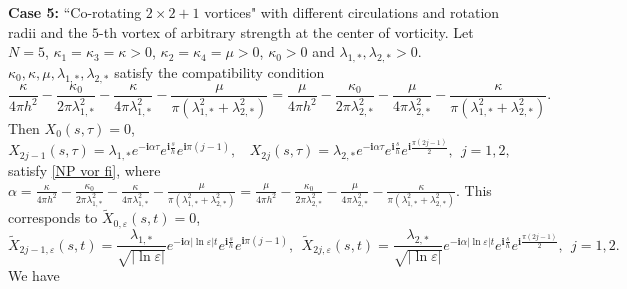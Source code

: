 \documentclass[12pt,reqno]{amsart}
\numberwithin{equation}{section}
\theoremstyle{definition}
\theoremstyle{remark}
\begin{document}
\textbf{Case 5:}  ``Co-rotating  $ 2\times2+1 $ vortices" with different circulations and rotation radii and the $ 5 $-th vortex of arbitrary strength
at the center of vorticity. Let $ N= 5 $, $ \kappa_1=\kappa_3=\kappa>0 $, $ \kappa_2=\kappa_4=\mu>0$, $ \kappa_0>0 $ and $ \lambda_{1,*},\lambda_{2,*}>0 $. $ \kappa_0,\kappa,\mu, \lambda_{1,*},\lambda_{2,*}  $  satisfy  the compatibility condition
\begin{equation}\label{compa cond3} 
\frac{\kappa}{4\pi h^2}-\frac{\kappa_0}{2\pi \lambda_{1,*}^2} -\frac{\kappa}{4\pi \lambda_{1,*}^2} -\frac{\mu}{\pi \left (\lambda_{1,*}^2+\lambda_{2,*}^2\right )}=\frac{\mu}{4\pi h^2}-\frac{\kappa_0}{2\pi \lambda_{2,*}^2} -\frac{\mu}{4\pi \lambda_{2,*}^2} -\frac{\kappa}{\pi \left (\lambda_{1,*}^2+\lambda_{2,*}^2\right )}.
\end{equation}
Then $ X_0(s,\tau)=0 $,
\begin{equation*}
X_{2j-1}(s,\tau)=\lambda_{1,*}e^{-\mathbf{i}\alpha\tau}e^{\mathbf{i}\frac{s}{h}}e^{\mathbf{i}\pi(j-1)},\ \ \ \ 	X_{2j}(s,\tau)=\lambda_{2,*}e^{-\mathbf{i}\alpha\tau}e^{\mathbf{i}\frac{s}{h}}e^{\mathbf{i}\frac{\pi(2j-1)}{2}},\ \ j=1,2,
\end{equation*}
satisfy \eqref{NP vor fi}, where $ \alpha=\frac{\kappa}{4\pi h^2}-\frac{\kappa_0}{2\pi \lambda_{1,*}^2} -\frac{\kappa}{4\pi \lambda_{1,*}^2} -\frac{\mu}{\pi \left (\lambda_{1,*}^2+\lambda_{2,*}^2\right )}=\frac{\mu}{4\pi h^2}-\frac{\kappa_0}{2\pi \lambda_{2,*}^2} -\frac{\mu}{4\pi \lambda_{2,*}^2} -\frac{\kappa}{\pi \left (\lambda_{1,*}^2+\lambda_{2,*}^2\right )}  $. This corresponds to  $ \tilde{X}_{0,\varepsilon}(s,t)=0 $,
\begin{equation} \label{fila 5}
\tilde{X}_{2j-1,\varepsilon}(s,t)=\frac{\lambda_{1,*}}{\sqrt{|\ln\varepsilon|}}e^{-\mathbf{i}\alpha|\ln\varepsilon|t}e^{\mathbf{i}\frac{s}{h}}e^{\mathbf{i}\pi(j-1)},\ \ 	\tilde{X}_{2j,\varepsilon}(s,t)=\frac{\lambda_{2,*}}{\sqrt{|\ln\varepsilon|}}e^{-\mathbf{i}\alpha|\ln\varepsilon|t}e^{\mathbf{i}\frac{s}{h}}e^{\mathbf{i}\frac{\pi(2j-1)}{2}},\ \ j=1,2.
\end{equation}
We have
\end{document}
